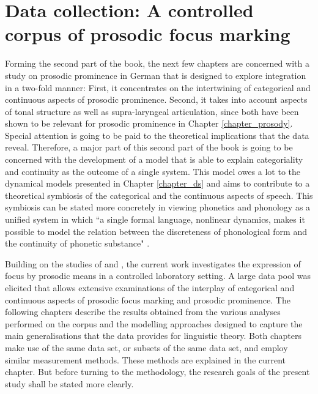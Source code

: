\chapter{Data collection: A controlled corpus of prosodic focus marking}
\label{chapter_data}

Forming the second part of the book, the next few chapters are concerned with a study on prosodic prominence in German that is designed to explore integration in a two-fold manner: First, it concentrates on the intertwining of categorical and continuous aspects of prosodic prominence. Second, it takes into account aspects of tonal structure as well as supra-laryngeal articulation, since both have been shown to be relevant for prosodic prominence in Chapter \ref{chapter_prosody}. Special attention is going to be paid to the theoretical implications that the data reveal. Therefore, a major part of this second part of the book is going to be concerned with the development of a model that is able to explain categoriality and continuity as the outcome of a single system. This model owes a lot to the dynamical models presented in Chapter \ref{chapter_ds} and aims to contribute to a theoretical symbiosis of the categorical and the continuous aspects of speech. This symbiosis can be stated more concretely in viewing phonetics and phonology as a unified system in which ``a single formal language, nonlinear dynamics, makes it possible to model the relation between the discreteness of phonological form and the continuity of phonetic substance" \citep[937]{GafosBenus2006}. 

Building on the studies of \citet{MückeGrice2014} and \citet{Griceetal2017}, the current work investigates the expression of focus by prosodic means in a controlled laboratory setting. A large data pool was elicited that allows extensive examinations of the interplay of categorical and continuous aspects of prosodic focus marking and prosodic prominence. The following chapters describe the results obtained from the various analyses performed on the corpus and the modelling approaches designed to capture the main generalisations that the data provides for linguistic theory. Both chapters make use of the same data set, or subsets of the same data set, and employ similar measurement methods. These methods are explained in the current chapter. But before turning to the methodology, the research goals of the present study shall be stated more clearly. 

